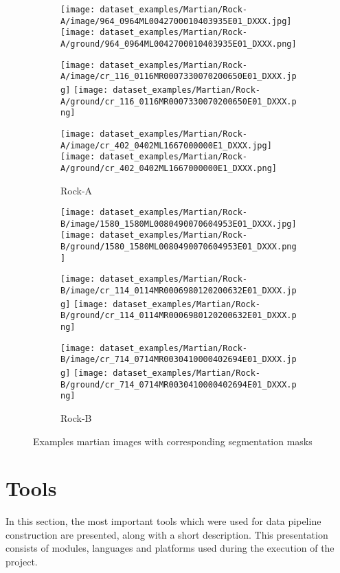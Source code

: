 \documentclass[a4paper,twoside,12pt]{book}
\begin{document}
\begin{figure}[!h]
    \centering
    \begin{subfigure}[b]{0.4\textwidth}
        \centering
        \texttt{[image: dataset\_examples/Martian/Rock-A/image/964\_0964ML0042700010403935E01\_DXXX.jpg]}
        \texttt{[image: dataset\_examples/Martian/Rock-A/ground/964\_0964ML0042700010403935E01\_DXXX.png]}

        \texttt{[image: dataset\_examples/Martian/Rock-A/image/cr\_116\_0116MR0007330070200650E01\_DXXX.jpg]}
        \texttt{[image: dataset\_examples/Martian/Rock-A/ground/cr\_116\_0116MR0007330070200650E01\_DXXX.png]}

        \texttt{[image: dataset\_examples/Martian/Rock-A/image/cr\_402\_0402ML1667000000E1\_DXXX.jpg]}
        \texttt{[image: dataset\_examples/Martian/Rock-A/ground/cr\_402\_0402ML1667000000E1\_DXXX.png]}

        \caption{Rock-A}
        \label{fig:rocka_martian_example}
    \end{subfigure}
    \begin{subfigure}[b]{0.4\textwidth}
        \centering
        \texttt{[image: dataset\_examples/Martian/Rock-B/image/1580\_1580ML0080490070604953E01\_DXXX.jpg]}
        \texttt{[image: dataset\_examples/Martian/Rock-B/ground/1580\_1580ML0080490070604953E01\_DXXX.png]}


        \texttt{[image: dataset\_examples/Martian/Rock-B/image/cr\_114\_0114MR0006980120200632E01\_DXXX.jpg]}
        \texttt{[image: dataset\_examples/Martian/Rock-B/ground/cr\_114\_0114MR0006980120200632E01\_DXXX.png]}

        \texttt{[image: dataset\_examples/Martian/Rock-B/image/cr\_714\_0714MR0030410000402694E01\_DXXX.jpg]}
        \texttt{[image: dataset\_examples/Martian/Rock-B/ground/cr\_714\_0714MR0030410000402694E01\_DXXX.png]}

        \caption{Rock-B}
        \label{fig:rockb_martian_example}
    \end{subfigure}
\caption{Examples martian images with corresponding segmentation masks}
\label{fig:martian_dataset_examples}
\end{figure}

\section{Tools}
In this section, the most important tools which were used for data pipeline construction are presented, along with a short description. This presentation consists of modules, languages and platforms used during the execution of the project.
\end{document}
